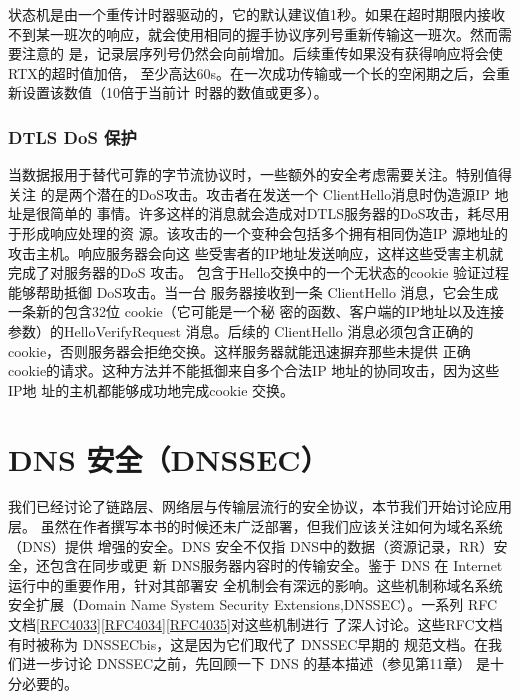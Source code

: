 状态机是由一个重传计时器驱动的，它的默认建议值1秒。如果在超时期限内接收
不到某一班次的响应，就会使用相同的握手协议序列号重新传输这一班次。然而需要注意的
是，记录层序列号仍然会向前增加。后续重传如果没有获得响应将会使 RTX的超时值加倍，
至少高达60s。在一次成功传输或一个长的空闲期之后，会重新设置该数值（10倍于当前计
时器的数值或更多）。

\subsubsection{DTLS DoS 保护}
当数据报用于替代可靠的字节流协议时，一些额外的安全考虑需要关注。特别值得关注
的是两个潜在的DoS攻击。攻击者在发送一个 ClientHello消息时伪造源IP 地址是很简单的
事情。许多这样的消息就会造成对DTLS服务器的DoS攻击，耗尽用于形成响应处理的资
源。该攻击的一个变种会包括多个拥有相同伪造IP 源地址的攻击主机。响应服务器会向这
些受害者的IP地址发送响应，这样这些受害主机就完成了对服务器的DoS 攻击。
包含于Hello交换中的一个无状态的cookie 验证过程能够帮助抵御 DoS攻击。当一台
服务器接收到一条 ClientHello 消息，它会生成一条新的包含32位 cookie（它可能是一个秘
密的函数、客户端的IP地址以及连接参数）的HelloVerifyRequest 消息。后续的 ClientHello
消息必须包含正确的 cookie，否则服务器会拒绝交换。这样服务器就能迅速摒弃那些未提供
正确 cookie的请求。这种方法并不能抵御来自多个合法IP 地址的协同攻击，因为这些IP地
址的主机都能够成功地完成cookie 交换。

\section{DNS 安全（DNSSEC）}
我们已经讨论了链路层、网络层与传输层流行的安全协议，本节我们开始讨论应用层。
虽然在作者撰写本书的时候还未广泛部署，但我们应该关注如何为域名系统（DNS）提供
增强的安全。DNS 安全不仅指 DNS中的数据（资源记录，RR）安全，还包含在同步或更
新 DNS服务器内容时的传输安全。鉴于 DNS 在 Internet 运行中的重要作用，针对其部署安
全机制会有深远的影响。这些机制称域名系统安全扩展（Domain Name System Security
Extensions,DNSSEC）。一系列 RFC 文档\href{https://www.rfc-editor.org/rfc/rfc4033}{[RFC4033]}\href{https://www.rfc-editor.org/rfc/rfc4034}{[RFC4034]}\href{https://www.rfc-editor.org/rfc/rfc4035}{[RFC4035]}对这些机制进行
了深人讨论。这些RFC文档有时被称为 DNSSECbis，这是因为它们取代了 DNSSEC早期的
规范文档。在我们进一步讨论 DNSSEC之前，先回顾一下 DNS 的基本描述（参见第11章）
是十分必要的。

